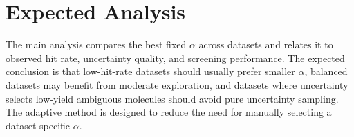 \section{Expected Analysis}
The main analysis compares the best fixed $\alpha$ across datasets and relates it to observed hit rate, uncertainty quality, and screening performance. The expected conclusion is that low-hit-rate datasets should usually prefer smaller $\alpha$, balanced datasets may benefit from moderate exploration, and datasets where uncertainty selects low-yield ambiguous molecules should avoid pure uncertainty sampling. The adaptive method is designed to reduce the need for manually selecting a dataset-specific $\alpha$.
